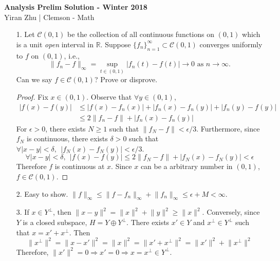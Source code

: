 


		\begin{center}
			\Large{\textbf{Analysis Prelim Solution - Winter 2018}}
			\normalsize{\\Yiran Zhu | Clemson - Math}
		\end{center}
\begin{itemize}
		\item[1.] Let $\mathcal{C}(0, 1)$ be the collection of all continuous functions on $(0, 1)$ which is a unit \textit{open} interval in $\mathbb{R}$. Suppose $\{f_n\}_{n=1}^\infty \subset \mathcal{C}(0, 1)$ converges uniformly to $f$ on $(0, 1)$, i.e.,
		$$\lVert f_n -f\rVert_\infty = \sup_{t\in (0,1)} |f_n(t)-f(t)| \rightarrow 0 \text{ as } n \rightarrow \infty.
		$$
		Can we say $f \in \mathcal{C}(0, 1)$? Prove or disprove.

		\begin{proof}
			Fix $x\in (0,1)$. Observe that $\forall y\in (0,1)$, 
			$$
			\begin{aligned}
			\lvert f(x) - f(y) \rvert &\le  \lvert f(x) - f_n(x) \rvert + \lvert f_n(x) - f_n(y) \rvert + \lvert f_n(y) - f(y)\rvert\\
			&\le 2\lVert f_n- f\rVert +  \lvert f_n(x) - f_n(y) \rvert 
			\end{aligned}
			$$
			For $\epsilon >0$, there exists $N\ge 1$ such that $\lVert f_N-f\rVert < \epsilon/3$. Furthermore, since $f_N$ is continuous, there exists $\delta >0$ such that $\forall \lvert x-y\rvert < \delta, ~~|f_N(x) - f_N(y)|<\epsilon/3$.
			$$
			\forall |x-y|< \delta, ~~\lvert f(x) - f(y) \rvert \le 2\lVert f_N- f\rVert +  \lvert f_N(x) - f_N(y) \rvert  < \epsilon
			$$
			Therefore $f$ is continuous at $x$. Since $x$ can be a arbitrary number in $(0,1)$, $f \in \mathcal{C}(0,1)$.
		\end{proof}
		
		\item[2.] Easy to show. $\lVert f\rVert_\infty \le \lVert f-f_n\rVert_\infty + \lVert f_n\rVert_\infty \le \epsilon + M < \infty$.
		
		\item[3.] If $x\in Y^\perp$, then $\lVert x-y\rVert^2 = \lVert x\rVert^2 +  \lVert y\rVert^2 \ge \lVert x\rVert^2$. Conversely, since $Y$ is a closed subspace, $H= Y\oplus Y^\perp$. There exists $x' \in Y$ and $x^\perp \in Y^\perp$ such that $x = x'+x^\perp$. Then 
		$$
		\lVert x^\perp \rVert^2=\lVert x - x'\rVert^2 = \lVert x\rVert^2 = \lVert  x'+x^\perp\rVert^2 =  \lVert x'\rVert^2+\lVert x^\perp\rVert^2
		$$
		Therefore, $\lVert x'\rVert^2 = 0 \Rightarrow x' = 0 \Rightarrow x= x^\perp \in Y^\perp$.
		

\end{itemize}
